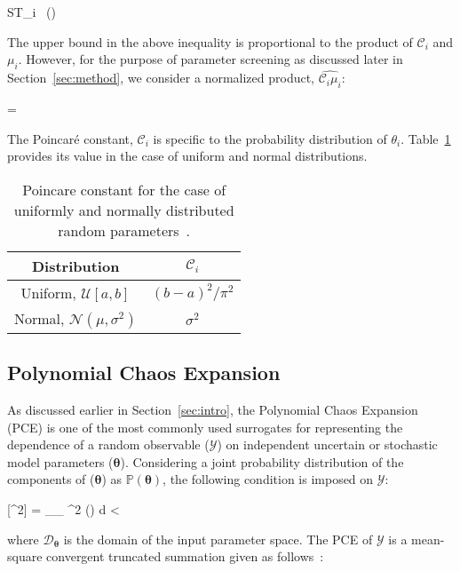 \be
ST_i \leq {}~(\propto {})
\label{eq:bound}
\ee

The upper bound in the above inequality is proportional to the product of $\mathcal{C}_i$
and $\mu_i$. However, for the purpose of parameter screening as discussed later in
Section~\ref{sec:method}, we consider a normalized product, $\hat{\mathcal{C}_i\mu_i}$:

\be
{} = 
\ee

The Poincar\'e constant, $\mathcal{C}_i$ is specific to the probability distribution of $\theta_i$.
Table~\ref{tab:poincare} provides its value in the case of uniform and normal
distributions.
\bigskip

\begin{table}[htbp]
\renewcommand*{\arraystretch}{1.2}
\begin{center}
\begin{tabular}{|c|c|}
\hline
Distribution & $\mathcal{C}_i$ \\ \hline \hline 
Uniform, $\mathcal{U}[a, b]$ & $(b-a)^{2}/\pi^2$ \\ 
Normal, $\mathcal{N}(\mu,\sigma^2)$ & $\sigma^2$ \\ 
\hline
\end{tabular}
\end{center}

\caption{Poincare constant for the case of uniformly and normally distributed random
parameters~\cite{Roustant:2014}.}
\label{tab:poincare}
\end{table}

\subsection{Polynomial Chaos Expansion}

As discussed earlier in Section~\ref{sec:intro}, the Polynomial Chaos Expansion (PCE)
is one of the most commonly used surrogates for representing the dependence of a random
observable ($\mathcal{Y}$) on independent uncertain or stochastic model parameters ($\bm{\theta}$).
Considering a joint probability distribution of the components of ($\bm{\theta}$) as $\mathbb{P}(\bm{\theta})$,
the following condition is imposed on $\mathcal{Y}$:

\be
{}[^2] = \int_{_{\bm{\theta}}} ^2 (\bm{\theta}) 
d\bm{\theta} < \infty
\ee

\noindent where $\mathcal{D}_{\bm{\theta}}$ is the domain of the input parameter space. The PCE of
$\mathcal{Y}$ is a mean-square convergent truncated summation given as
follows~\cite{Xiu:2002,Ghanem:2003,Olivier:2010}:

